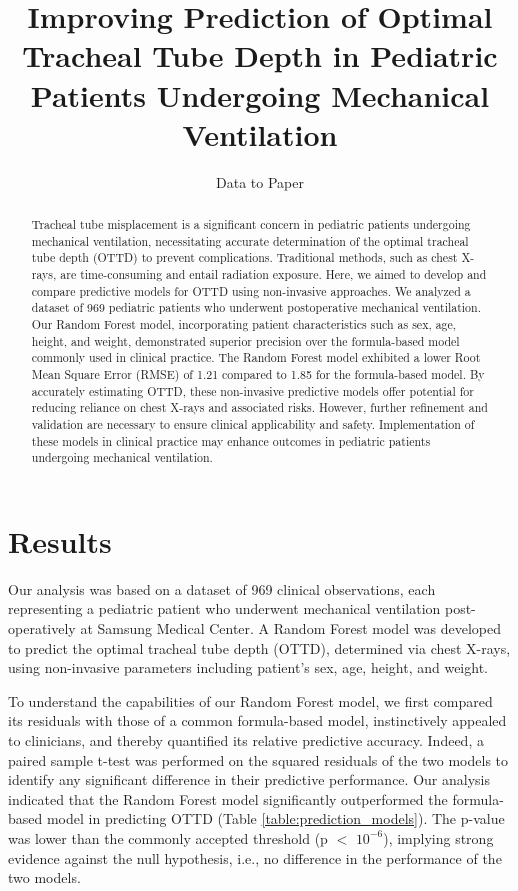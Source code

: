 \documentclass[11pt]{article}
\title{Improving Prediction of Optimal Tracheal Tube Depth in Pediatric Patients Undergoing Mechanical Ventilation}
\author{Data to Paper}
\begin{document}
\maketitle
\begin{abstract}
Tracheal tube misplacement is a significant concern in pediatric patients undergoing mechanical ventilation, necessitating accurate determination of the optimal tracheal tube depth (OTTD) to prevent complications. Traditional methods, such as chest X-rays, are time-consuming and entail radiation exposure. Here, we aimed to develop and compare predictive models for OTTD using non-invasive approaches. We analyzed a dataset of 969 pediatric patients who underwent postoperative mechanical ventilation. Our Random Forest model, incorporating patient characteristics such as sex, age, height, and weight, demonstrated superior precision over the formula-based model commonly used in clinical practice. The Random Forest model exhibited a lower Root Mean Square Error (RMSE) of 1.21 compared to 1.85 for the formula-based model. By accurately estimating OTTD, these non-invasive predictive models offer potential for reducing reliance on chest X-rays and associated risks. However, further refinement and validation are necessary to ensure clinical applicability and safety. Implementation of these models in clinical practice may enhance outcomes in pediatric patients undergoing mechanical ventilation.
\end{abstract}
\section*{Results}

Our analysis was based on a dataset of 969 clinical observations, each representing a pediatric patient who underwent mechanical ventilation post-operatively at Samsung Medical Center. A Random Forest model was developed to predict the optimal tracheal tube depth (OTTD), determined via chest X-rays, using non-invasive parameters including patient's sex, age, height, and weight.

To understand the capabilities of our Random Forest model, we first compared its residuals with those of a common formula-based model, instinctively appealed to clinicians, and thereby quantified its relative predictive accuracy. Indeed, a paired sample t-test was performed on the squared residuals of the two models to identify any significant difference in their predictive performance. Our analysis indicated that the Random Forest model significantly outperformed the formula-based model in predicting OTTD (Table \ref{table:prediction_models}). The p-value was lower than the commonly accepted threshold (p $<$ $10^{-6}$), implying strong evidence against the null hypothesis, i.e., no difference in the performance of the two models.
\end{document}

